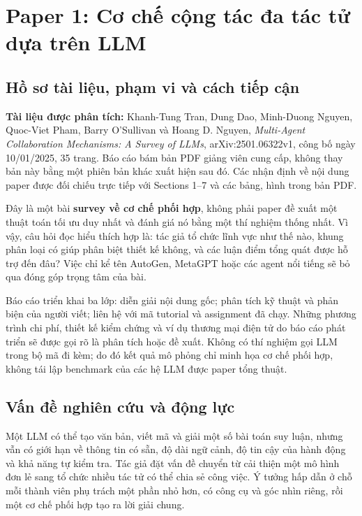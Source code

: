 \section{Paper 1: Cơ chế cộng tác đa tác tử dựa trên
LLM}\label{paper-1-cux1a1-chux1ebf-cux1ed9ng-tuxe1c-ux111a-tuxe1c-tux1eed-dux1ef1a-truxean-llm}

\subsection{Hồ sơ tài liệu, phạm vi và cách tiếp
cận}\label{hux1ed3-sux1a1-tuxe0i-liux1ec7u-phux1ea1m-vi-vuxe0-cuxe1ch-tiux1ebfp-cux1eadn}

\textbf{Tài liệu được phân tích:} Khanh-Tung Tran, Dung Dao, Minh-Duong
Nguyen, Quoc-Viet Pham, Barry O'Sullivan và Hoang D. Nguyen,
\emph{Multi-Agent Collaboration Mechanisms: A Survey of LLMs},
arXiv:2501.06322v1, công bố ngày 10/01/2025, 35 trang. Báo cáo bám bản
PDF giảng viên cung cấp, không thay bản này bằng một phiên bản khác xuất
hiện sau đó. Các nhận định về nội dung paper được đối chiếu trực tiếp
với Sections 1--7 và các bảng, hình trong bản PDF. \cite{tran}

Đây là một bài \textbf{survey về cơ chế phối hợp}, không phải paper đề
xuất một thuật toán tối ưu duy nhất và đánh giá nó bằng một thí nghiệm
thống nhất. Vì vậy, câu hỏi đọc hiểu thích hợp là: tác giả tổ chức lĩnh
vực như thế nào, khung phân loại có giúp phân biệt thiết kế không, và
các luận điểm tổng quát được hỗ trợ đến đâu? Việc chỉ kể tên AutoGen,
MetaGPT hoặc các agent nổi tiếng sẽ bỏ qua đóng góp trọng tâm của bài.

Báo cáo triển khai ba lớp: diễn giải nội dung gốc; phân tích kỹ thuật và
phản biện của người viết; liên hệ với mã tutorial và assignment đã chạy.
Những phương trình chi phí, thiết kế kiểm chứng và ví dụ thương mại điện
tử do báo cáo phát triển sẽ được gọi rõ là phân tích hoặc đề xuất. Không
có thí nghiệm gọi LLM trong bộ mã đi kèm; do đó kết quả mô phỏng chỉ
minh họa cơ chế phối hợp, không tái lập benchmark của các hệ LLM được
paper tổng thuật.

\subsection{Vấn đề nghiên cứu và động
lực}\label{vux1ea5n-ux111ux1ec1-nghiuxean-cux1ee9u-vuxe0-ux111ux1ed9ng-lux1ef1c}

Một LLM có thể tạo văn bản, viết mã và giải một số bài toán suy luận,
nhưng vẫn có giới hạn về thông tin có sẵn, độ dài ngữ cảnh, độ tin cậy
của hành động và khả năng tự kiểm tra. Tác giả đặt vấn đề chuyển từ cải
thiện một mô hình đơn lẻ sang tổ chức nhiều tác tử có thể chia sẻ công
việc. Ý tưởng hấp dẫn ở chỗ mỗi thành viên phụ trách một phần nhỏ hơn,
có công cụ và góc nhìn riêng, rồi một cơ chế phối hợp tạo ra lời giải
chung.

